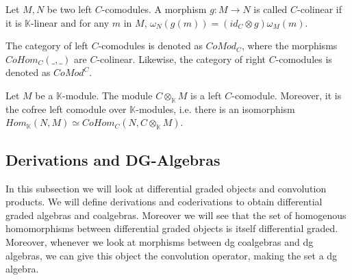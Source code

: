 \documentclass[../thesis.tex]{subfiles}
\begin{document}
\begin{definition}[Comodules]
\begin{center}
                \end{center}
            \end{definition}

            \begin{definition}
                Let $M,N$ be two left $C$-comodules. A morphism $g:M\rightarrow N$ is called $C$-colinear if it is $\mathbb{K}$-linear and for any $m$ in $M$, $\omega_N(g(m)) = (id_C\otimes g)\omega_M(m)$.
            \end{definition}

            The category of left $C$-comodules is denoted as $CoMod_C$, where the morphisms $CoHom_C(\_,\_)$ are $C$-colinear. Likewise, the category of right $C$-comodules is denoted as $CoMod^C$.

            \begin{proposition}
                Let $M$ be a $\mathbb{K}$-module. The module $C\otimes_{\mathbb{K}}M$ is a left $C$-comodule. Moreover, it is the cofree left comodule over $\mathbb{K}$-modules, i.e. there is an isomorphism $Hom_{\mathbb{K}}(N,M)\simeq CoHom_C(N,C\otimes_{\mathbb{K}}M)$. 
            \end{proposition}

        \subsection{Derivations and DG-Algebras}
            In this subsection we will look at differential graded objects and convolution products. We will define derivations and coderivations to obtain differential graded algebras and coalgebras. Moreover we will see that the set of homogenous homomorphisms between differential graded objects is itself differential graded. Moreover, whenever we look at morphisms between dg coalgebras and dg algebras, we can give this object the convolution operator, making the set a dg algebra.
\end{document}
